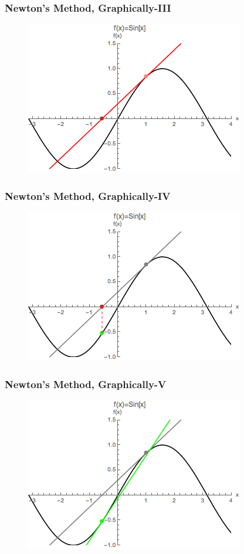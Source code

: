 \documentclass{beamer}
\begin{document}
\begin{frame}
\frametitle[alignment=center]{Newton's Method, Graphically-III}
\begin{figure}[htdb!]
\centering
\includegraphics[scale=0.8]{Newton_3.png}
\end{figure}
\end{frame}

\begin{frame}
\frametitle[alignment=center]{Newton's Method, Graphically-IV}
\begin{figure}[htdb!]
\centering
\includegraphics[scale=0.8]{Newton_4.png}
\end{figure}
\end{frame}

\begin{frame}
\frametitle[alignment=center]{Newton's Method, Graphically-V}
\begin{figure}[htdb!]
\centering
\includegraphics[scale=0.8]{Newton_5.png}
\end{figure}
\end{frame}
\end{document}
